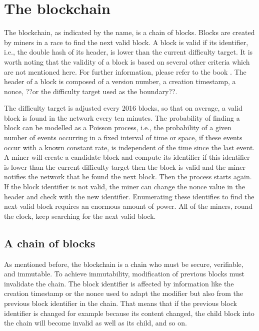 \section{The blockchain}

The blockchain, as indicated by the name, is a chain of blocks. Blocks are
created by miners in a race to find the next valid block. A block is valid if its identifier, i.e., the double hash of its
header, is lower than the current difficulty target. It is worth noting that the
validity of a block is based on several other criteria which are not mentioned
here.  For further information, please refer to the book .
The header of a block is composed of a version number, a creation timestamp, a
nonce, ??or the difficulty target used as the boundary??.

The difficulty target is adjusted every 2016 blocks, so that on average, a valid block is found in the network every ten minutes. The probability of finding a block can be modelled as a Poisson process,
i.e., the probability of a given number of events occurring in a fixed interval
of time or space, if these events occur with a known constant rate, is independent
of the time since the last event. A miner will create a candidate block and
compute its identifier if this identifier is lower than the current difficulty
target then the block is valid and the miner notifies the network that he found
the next block. Then the process starts again. If the block identifier is not
valid, the miner can change the nonce value in the header and check with the new
identifier. Enumerating these identifies to find the next valid block requires an
enormous amount of power. All of the miners, round the clock, keep searching for
the next valid block.

\subsection{A chain of blocks}

As mentioned before, the blockchain is a chain who must be secure, verifiable,
and immutable. To achieve immutability, modification of previous blocks must
invalidate the chain. The block identifier is affected by information like the
creation timestamp or the nonce used to adapt the modifier but also from the
previous block identifier in the chain. That means that if the previous block
identifier is changed for example because its content changed, the child block
into the chain will become invalid as well as its child, and so on.

